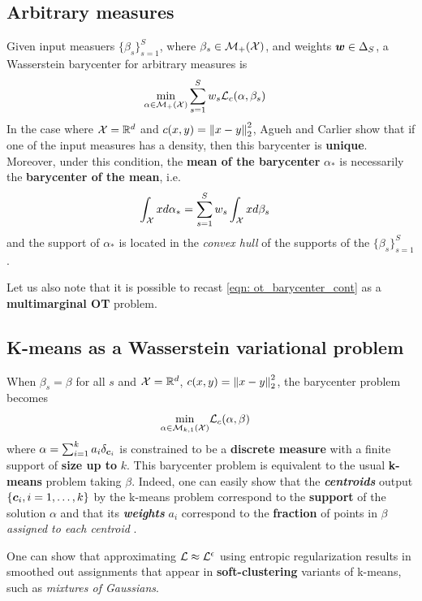 \documentclass[11pt]{article}
\begin{document}
\subsection{Arbitrary measures}
Given input measuers $\{\beta_s\}_{s=1}^{S}$, where $\beta_s \in {\mathcal M}_{+}({\mathcal X})$, and weights $\boldsymbol{w} \in \Delta_{S}$, a Wasserstein barycenter for arbitrary measures is 
\begin{align}
\min_{\alpha \in {\mathcal M}_{+}({\mathcal X})}& \sum_{s=1}^{S}w_{s}{\mathcal L}_{c}(\alpha, \beta_{s}) \label{eqn: ot_barycenter_cont}
\end{align} In the case where ${\mathcal X} = {\mathbb R}^d$ and $c(x, y) = \left\|x - y\right\|_{2}^2$, Agueh and Carlier show that if one of the input measures has a density, then this barycenter is \textbf{unique}. Moreover, under this condition, the \textbf{mean of the barycenter} $\alpha_{*}$ is necessarily the \textbf{barycenter of the mean}, i.e.
\begin{align}
\int_{{\mathcal X}}x d \alpha_{*} &= \sum_{s=1}^{S}w_{s} \int_{{\mathcal X}} x d\beta_{s}  \nonumber
\end{align} and the support of $\alpha_{*}$ is located in the \emph{convex hull} of the supports of the $\{\beta_s\}_{s=1}^{S}$.

Let us also note that it is possible to recast \eqref{eqn: ot_barycenter_cont} as a \textbf{multimarginal OT} problem.

\subsection{K-means as a Wasserstein variational problem}
When $\beta_s = \beta$ for all $s$ and ${\mathcal X} = {\mathbb R}^{d}$, $c(x, y) = \left\|x - y\right\|_{2}^2$, the barycenter problem becomes 
\begin{align*}
\min_{\alpha \in {\mathcal M}_{k, 1}({\mathcal X})}& {\mathcal L}_{c}(\alpha, \beta)
\end{align*} where $\alpha = \sum_{i=1}^{k}a_i \delta_{\boldsymbol{c}_i}$ is constrained to be a \textbf{discrete measure} with a finite support of \textbf{size up to} $k$.  This barycenter problem  is equivalent to the usual \textbf{k-means} problem taking $\beta$. Indeed, one can easily show that the \textbf{\emph{centroids}} output $\{\boldsymbol{c}_{i}, i=1,\ldots, k\}$ by the k-means problem correspond to the \textbf{support} of the solution $\alpha$ and that its \emph{\textbf{weights}} $a_i$ correspond to the \textbf{fraction} of points in $\beta$ \emph{assigned to each centroid} \citep{canas2012learning}.

One can show that approximating ${\mathcal L} \approx {\mathcal L}^{\epsilon}$ using entropic regularization results in smoothed out assignments that appear in \textbf{soft-clustering} variants of k-means, such as \emph{mixtures of Gaussians}.
\end{document}
